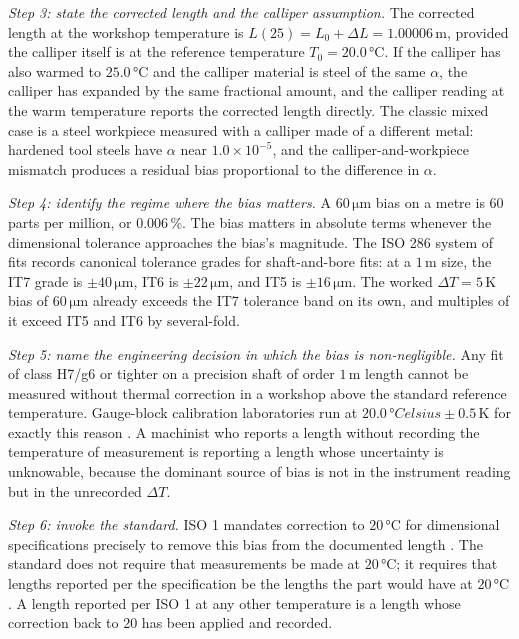\emph{Step 3: state the corrected length and the calliper
assumption.}
The corrected length at the workshop temperature is $L(25) =
L_{0} + \Delta L = 1.00006 \,\si{\meter}$, provided the calliper
itself is at the reference temperature $T_{0} = 20.0 \,\si
{\degreeCelsius}$. If the calliper has also warmed to $25.0 \,\si
{\degreeCelsius}$ and the calliper material is steel of the same
$\alpha$, the calliper has expanded by the same fractional amount,
and the calliper reading at the warm temperature reports the
corrected length directly. The classic mixed case is a steel
workpiece measured with a calliper made of a different metal:
hardened tool steels have $\alpha$ near $1.0 \times 10^{-5}$, and
the calliper-and-workpiece mismatch produces a residual bias
proportional to the difference in $\alpha$.

\emph{Step 4: identify the regime where the bias matters.}
A $60 \,\si{\micro\meter}$ bias on a metre is $60$ parts per
million, or $0.006\,\%$. The bias matters in absolute terms
whenever the dimensional tolerance approaches the bias's
magnitude. The ISO 286 system of fits records canonical tolerance
grades for shaft-and-bore fits: at a $1 \,\si{\meter}$ size, the
IT7 grade is $\pm 40 \,\si{\micro\meter}$, IT6 is $\pm 22 \,\si
{\micro\meter}$, and IT5 is $\pm 16 \,\si{\micro\meter}$. The
worked $\Delta T = 5 \,\si{\kelvin}$ bias of $60 \,\si{\micro
\meter}$ already exceeds the IT7 tolerance band on its own, and
multiples of it exceed IT5 and IT6 by several-fold.

\emph{Step 5: name the engineering decision in which the bias is
non-negligible.}
Any fit of class H7/g6 or tighter on a precision shaft of order
$1 \,\si{\meter}$ length cannot be measured without thermal
correction in a workshop above the standard reference temperature.
Gauge-block calibration laboratories run at $20.0 \,\si{\degree
Celsius} \pm 0.5 \,\si{\kelvin}$ for exactly this reason
\cite{text:doiron-beers-2009}. A machinist who reports a length
without recording the temperature of measurement is reporting a
length whose uncertainty is unknowable, because the dominant
source of bias is not in the instrument reading but in the
unrecorded $\Delta T$.

\emph{Step 6: invoke the standard.}
ISO 1 mandates correction to $20 \,\si{\degreeCelsius}$ for
dimensional specifications precisely to remove this bias from the
documented length \cite{std:iso-1-2022}. The standard does not
require that measurements be made at $20 \,\si{\degreeCelsius}$;
it requires that lengths reported per the specification be the
lengths the part would have at $20 \,\si{\degreeCelsius}$. A
length reported per ISO 1 at any other temperature is a length
whose correction back to $20$ has been applied and recorded.

